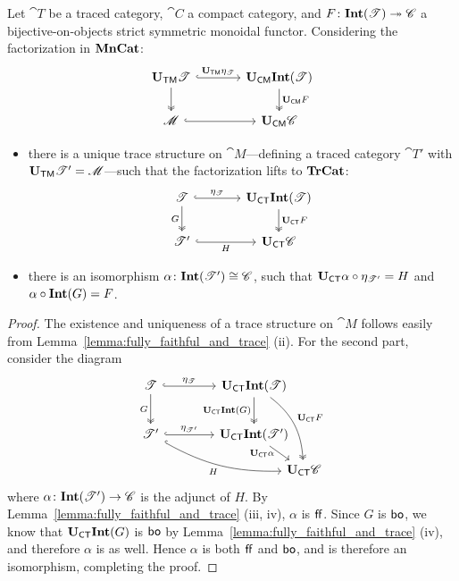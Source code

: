 \documentclass[11pt,oneside,article]{memoir}
\begin{document}
\begin{lemma}
      \label{lem:Tr_bo_Int}
   Let $\cat{T}$ be a traced category, $\cat{C}$ a compact category, and $F\colon\mathbf{Int}(\mathscr{T})\twoheadrightarrow \mathscr{C}$ a
   bijective-on-objects strict symmetric monoidal functor. Considering the factorization in
   $\mathbf{MnCat}$:
   \[ \begin{tikzcd}[column sep=large]
      \UTM \cat{T} \ar[r,hook,"\UTM\eta_{\cat{T}}"] \ar[d,two heads]
         & \UCM\Int(\cat{T}) \ar[d,two heads,"\UCM F"] \\
      \cat{M} \ar[r,hook] & \UCM \cat{C}
   \end{tikzcd} \]
   \begin{itemize}
      \item there is a unique trace structure on $\cat{M}$---defining a traced category $\cat{T}'$ with $\mathbf{U}_{\mathsf{TM}}
         \mathscr{T}'=\mathscr{M}$---such that the factorization lifts to $\mathbf{TrCat}$:
         \[ \begin{tikzcd}[column sep=large]
            \cat{T} \ar[r,hook,"\eta_{\cat{T}}"] \ar[d,two heads,"G"']
               & \UCT\Int(\cat{T}) \ar[d,two heads,"\UCT F"] \\
            \cat{T}' \ar[r,hook,"H"'] & \UCT \cat{C}
         \end{tikzcd} \]
      \item there is an isomorphism $\alpha\colon\mathbf{Int}(\mathscr{T}')\cong \mathscr{C}$, such that $\mathbf{U}_{\mathsf{CT}}\alpha\circ
         \eta_{\mathscr{T}'}=H$ and $\alpha\circ\mathbf{Int}(G)=F$.
   \end{itemize}
\end{lemma}
\begin{proof}
   The existence and uniqueness of a trace structure on $\cat{M}$ follows easily from
   Lemma~\ref{lemma:fully_faithful_and_trace} (ii). For the second part, consider the diagram
   \[ \begin{tikzcd}[column sep=4em, row sep=5ex]
      \cat{T} \ar[r,hook,"\eta_{\cat{T}}"] \ar[d,two heads,"G"']
         & \UCT\Int(\cat{T}) \ar[d,two heads,"\UCT\Int(G)"']
            \ar[ddr,two heads,bend left=25,"\UCT F"] &[between origins] \\
      \cat{T}' \ar[r,hook,"\eta_{\cat{T}'}"] \ar[drr,hook,bend right=15,"H"']
         & \UCT\Int(\cat{T}') \ar[dr,"\UCT\alpha"' {inner sep=0pt,pos=.25}] & \\[-10]
      &&\UCT \cat{C}
   \end{tikzcd} \]
   where $\alpha\colon\mathbf{Int}(\mathscr{T}')\to \mathscr{C}$ is the adjunct of $H$. By
   Lemma~\ref{lemma:fully_faithful_and_trace} (iii, iv), $\alpha$ is $\mathsf{ff}$. Since $G$ is $\mathsf{bo}$, we
   know that $\mathbf{U}_{\mathsf{CT}}\mathbf{Int}(G)$ is $\mathsf{bo}$ by Lemma~\ref{lemma:fully_faithful_and_trace} (iv), and
   therefore $\alpha$ is as well. Hence $\alpha$ is both $\mathsf{ff}$ and $\mathsf{bo}$, and is therefore an
   isomorphism, completing the proof.
\end{proof}
\end{document}
